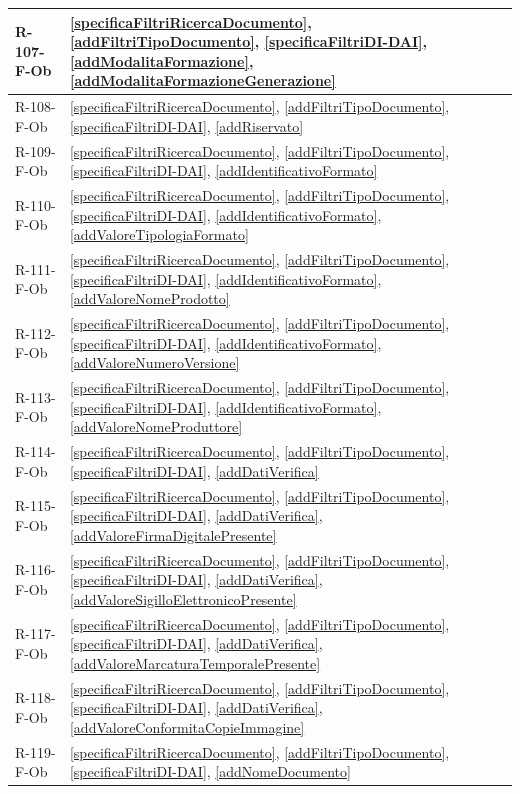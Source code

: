 \begin{longtable}{|p{4cm}|p{10cm}|}
\hline
R-107-F-Ob & \ref{specificaFiltriRicercaDocumento}, \ref{addFiltriTipoDocumento}, \ref{specificaFiltriDI-DAI}, \ref{addModalitaFormazione}, \ref{addModalitaFormazioneGenerazione} \\
\hline
R-108-F-Ob & \ref{specificaFiltriRicercaDocumento}, \ref{addFiltriTipoDocumento}, \ref{specificaFiltriDI-DAI}, \ref{addRiservato} \\
\hline
R-109-F-Ob & \ref{specificaFiltriRicercaDocumento}, \ref{addFiltriTipoDocumento}, \ref{specificaFiltriDI-DAI}, \ref{addIdentificativoFormato} \\
\hline
R-110-F-Ob & \ref{specificaFiltriRicercaDocumento}, \ref{addFiltriTipoDocumento}, \ref{specificaFiltriDI-DAI}, \ref{addIdentificativoFormato}, \ref{addValoreTipologiaFormato} \\
\hline
R-111-F-Ob & \ref{specificaFiltriRicercaDocumento}, \ref{addFiltriTipoDocumento}, \ref{specificaFiltriDI-DAI}, \ref{addIdentificativoFormato}, \ref{addValoreNomeProdotto} \\
\hline
R-112-F-Ob & \ref{specificaFiltriRicercaDocumento}, \ref{addFiltriTipoDocumento}, \ref{specificaFiltriDI-DAI}, \ref{addIdentificativoFormato}, \ref{addValoreNumeroVersione} \\
\hline
R-113-F-Ob & \ref{specificaFiltriRicercaDocumento}, \ref{addFiltriTipoDocumento}, \ref{specificaFiltriDI-DAI}, \ref{addIdentificativoFormato}, \ref{addValoreNomeProduttore} \\
\hline
R-114-F-Ob & \ref{specificaFiltriRicercaDocumento}, \ref{addFiltriTipoDocumento}, \ref{specificaFiltriDI-DAI}, \ref{addDatiVerifica} \\
\hline
R-115-F-Ob & \ref{specificaFiltriRicercaDocumento}, \ref{addFiltriTipoDocumento}, \ref{specificaFiltriDI-DAI}, \ref{addDatiVerifica}, \ref{addValoreFirmaDigitalePresente} \\
\hline
R-116-F-Ob & \ref{specificaFiltriRicercaDocumento}, \ref{addFiltriTipoDocumento}, \ref{specificaFiltriDI-DAI}, \ref{addDatiVerifica}, \ref{addValoreSigilloElettronicoPresente} \\
\hline
R-117-F-Ob & \ref{specificaFiltriRicercaDocumento}, \ref{addFiltriTipoDocumento}, \ref{specificaFiltriDI-DAI}, \ref{addDatiVerifica}, \ref{addValoreMarcaturaTemporalePresente} \\
\hline
R-118-F-Ob & \ref{specificaFiltriRicercaDocumento}, \ref{addFiltriTipoDocumento}, \ref{specificaFiltriDI-DAI}, \ref{addDatiVerifica}, \ref{addValoreConformitaCopieImmagine} \\
\hline
R-119-F-Ob & \ref{specificaFiltriRicercaDocumento}, \ref{addFiltriTipoDocumento}, \ref{specificaFiltriDI-DAI}, \ref{addNomeDocumento} \\

\end{longtable}
